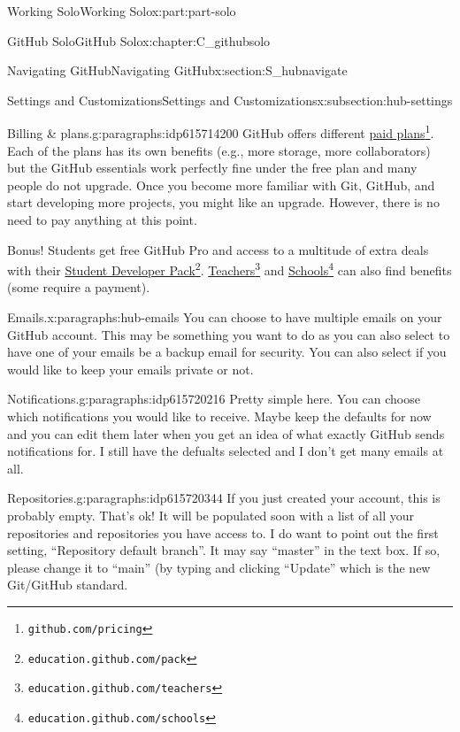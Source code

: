 \documentclass[oneside,10pt,]{book}
\begin{document}
\begin{partptx}{Working Solo}{}{Working Solo}{}{}{x:part:part-solo}
\begin{chapterptx}{GitHub Solo}{}{GitHub Solo}{}{}{x:chapter:C_githubsolo}
\begin{sectionptx}{Navigating GitHub}{}{Navigating GitHub}{}{}{x:section:S_hubnavigate}
\begin{subsectionptx}{Settings and Customizations}{}{Settings and Customizations}{}{}{x:subsection:hub-settings}
\begin{paragraphs}{Billing \& plans.}{g:paragraphs:idp615714200}
GitHub offers different \href{https://github.com/pricing}{paid plans}\footnote{\nolinkurl{github.com/pricing}\label{g:fn:idp615714840}}. Each of the plans has its own benefits (e.g., more storage, more collaborators) but the GitHub essentials work perfectly fine under the free plan and many people do not upgrade. Once you become more familiar with Git, GitHub, and start developing more projects, you might like an upgrade. However, there is no need to pay anything at this point.%
\par
Bonus! Students get free GitHub Pro and access to a multitude of extra deals with their \href{https://education.github.com/pack}{Student Developer Pack}\footnote{\nolinkurl{education.github.com/pack}\label{g:fn:idp615715352}}. \href{https://education.github.com/teachers}{Teachers}\footnote{\nolinkurl{education.github.com/teachers}\label{g:fn:idp615709720}} and \href{https://education.github.com/schools}{Schools}\footnote{\nolinkurl{education.github.com/schools}\label{g:fn:idp615710744}} can also find benefits (some require a payment).%
\end{paragraphs}%
\begin{paragraphs}{Emails.}{x:paragraphs:hub-emails}%
%
You can choose to have multiple emails on your GitHub account. This may be something you want to do as you can also select to have one of your emails be a backup email for security. You can also select if you would like to keep your emails private or not.%
\end{paragraphs}%
\begin{paragraphs}{Notifications.}{g:paragraphs:idp615720216}%
%
Pretty simple here. You can choose which notifications you would like to receive. Maybe keep the defaults for now and you can edit them later when you get an idea of what exactly GitHub sends notifications for. I still have the defualts selected and I don't get many emails at all.%
\end{paragraphs}%
\begin{paragraphs}{Repositories.}{g:paragraphs:idp615720344}%
%
%
If you just created your account, this is probably empty. That's ok! It will be populated soon with a list of all your repositories and repositories you have access to. I do want to point out the first setting, ``Repository default branch''. It may say ``master'' in the text box. If so, please change it to ``main'' (by typing and clicking ``Update'' which is the new Git\slash{}GitHub standard.%
\par

\end{paragraphs}
\end{subsectionptx}
\end{sectionptx}
\end{chapterptx}
\end{partptx}
\end{document}

